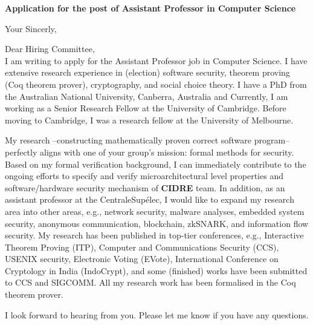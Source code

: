\documentclass[11pt,a4paper,roman]{moderncv}
\begin{document}
\date{}
\opening{\textbf{Application for the post of Assistant Professor in Computer Science}}

\closing{Your Sincerly, \vspace{-1em}}



\makelettertitle



Dear Hiring Committee, 
\\
\vspace{1em}
I am writing to apply
for the Assistant Professor job in Computer Science.
I have extensive research experience in
(election) software security, theorem proving (Coq theorem prover), cryptography,  
and social choice theory. 
I have a PhD from the Australian National University, Canberra, Australia
and Currently, I am working as a Senior Research Fellow at the University of 
Cambridge. Before moving to Cambridge, I was a 
research fellow at the University of Melbourne. 


My research --constructing mathematically proven correct software program-- 
perfectly aligns with one of your group's mission: formal methods for security. 
Based on my formal verification background, 
I can immediately contribute to the ongoing efforts to specify and verify 
microarchitectural level properties and software/hardware 
security mechanism of \textbf{CIDRE} team.  
In addition, as an assistant professor at the CentraleSup\'elec, 
I would like to expand my research area into other areas, e.g., 
network security, malware analyses, embedded 
system security, anonymous communication, blockchain, zkSNARK,
and information flow security. My research has been published in top-tier 
conferences, e.g., Interactive Theorem Proving (ITP), 
Computer and Communications Security (CCS), USENIX security, Electronic Voting (EVote), 
International Conference on Cryptology in India (IndoCrypt),
and some (finished) works have been submitted to CCS and SIGCOMM. 
All my research work has been formalised in the Coq theorem prover. 




\vspace{0.5cm}



I look forward to hearing from you. Please let me know if you have any questions. \\
 

\vspace{0.5cm}


\makeletterclosing
\end{document}
